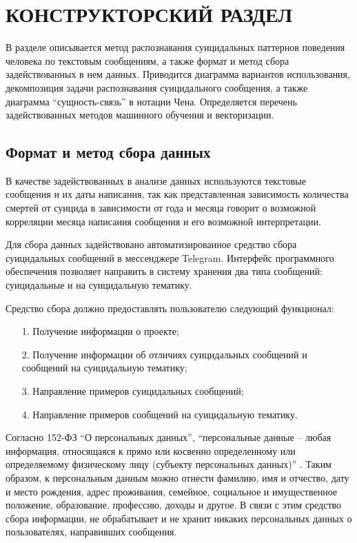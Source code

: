 \section{КОНСТРУКТОРСКИЙ РАЗДЕЛ}

В разделе описывается метод распознавания суицидальных паттернов поведения человека по текстовым сообщениям, а также формат и метод сбора задействованных в нем данных. 
Приводится диаграмма вариантов использования, декомпозиция задачи распознавания суицидального сообщения, а также диаграмма ``сущность-связь'' в нотации Чена. 
Определяется перечень задействованных методов машинного обучения и векторизации.

\subsection{Формат и метод сбора данных}

В качестве задействованных в анализе данных используются текстовые сообщения и их даты написания, так как представленная зависимость количества смертей от суицида в зависимости от года и месяца говорит о возможной корреляции месяца написания сообщения и его возможной интерпретации.

Для сбора данных задействовано автоматизированное средство сбора суицидальных сообщений в мессенджере Telegram. Интерфейс программного обеспечения позволяет направить в систему хранения два типа сообщений: суицидальные и на суицидальную тематику.

Средство сбора должно предоставлять пользователю следующий функционал:

\begin{enumerate}
\item[1.] Получение информации о проекте;
\item[2.] Получение информации об отличиях суицидальных сообщений и сообщений на суицидальную тематику;
\item[3.] Направление примеров суицидальных сообщений;
\item[4.] Направление примеров сообщений на суицидальную тематику.
\end{enumerate}

Согласно 152-ФЗ ``О персональных данных'', ``персональные данные -- любая информация, относящаяся к прямо или косвенно определенному или определяемому физическому лицу (субъекту персональных данных)'' \cite{fzpers}. Таким образом, к персональным данным можно отнести фамилию, имя и отчество, дату и место рождения, адрес проживания, семейное, социальное и имущественное положение, образование, профессию, доходы и другое. В связи с этим средство сбора информации, не обрабатывает и не хранит никаких персональных данных о пользователях, направивших сообщения.

